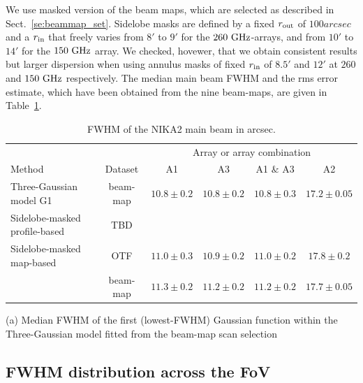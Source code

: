 We use masked version of the beam maps, which are selected as
described in Sect.~\ref{se:beammap_set}. 
Sidelobe masks are defined by a fixed $r_{\rm{out}}$ of $100 arcsec$
and a $r_{\rm{in}}$ that freely varies from $8'$ to $9'$ for the
$260~\rm{GHz}$-arrays, and from $10'$ to $14'$ for the $150~\rm{GHz}$
array. We checked, hovewer, that we obtain consistent results but
larger dispersion when using annulus masks of fixed $r_{\rm{in}}$ of
$8.5'$ and $12'$ at $260$ and $150~\rm{GHz}$ respectively. The median
main beam FWHM and the rms error estimate, which have been obtained
from the nine beam-maps, are given in Table~\ref{tab:fwhm}.

\begin{table}[h]
  \caption[]{FWHM of the NIKA2 main beam in arcsec.}
  \centering
  \begin{threeparttable}
  \begin{tabular}{|l|c|c|c|c|c|}
    \hline
    
       &    &  \multicolumn{4}{|c|}{Array or array combination} \\
    \cline{3-6}
    Method & Dataset        &   A1 &  A3 & A1 $\&$ A3 &  A2  \\
    \hline
    \hline
    Three-Gaussian model G1\tnote{a} &  beam-map &  $10.8 \pm 0.2$  &  $10.8 \pm 0.2$  &  $10.8 \pm 0.3$  &  $17.2 \pm 0.05$  \\
    Sidelobe-masked profile-based    &  TBD      &    &    &    &   \\
    Sidelobe-masked map-based        &  OTF       & $11.0 \pm 0.3$  &  $10.9 \pm 0.2$  &  $11.0 \pm 0.2$  &  $17.8 \pm 0.2$ \\ 
                                     &  beam-map  & $11.3 \pm 0.2$  & $11.2 \pm 0.2$   &  $11.2 \pm 0.2$  &  $17.7 \pm 0.05$ \\ 
    \hline
  \end{tabular}
  \begin{tablenotes}
  \item[(a)] Median FWHM of the first (lowest-FWHM) Gaussian function
    within the Three-Gaussian model fitted from the beam-map scan selection 
  \end{tablenotes}
  \end{threeparttable}
  \label{tab:fwhm}
\end{table}

\subsection{FWHM distribution across the FoV}

